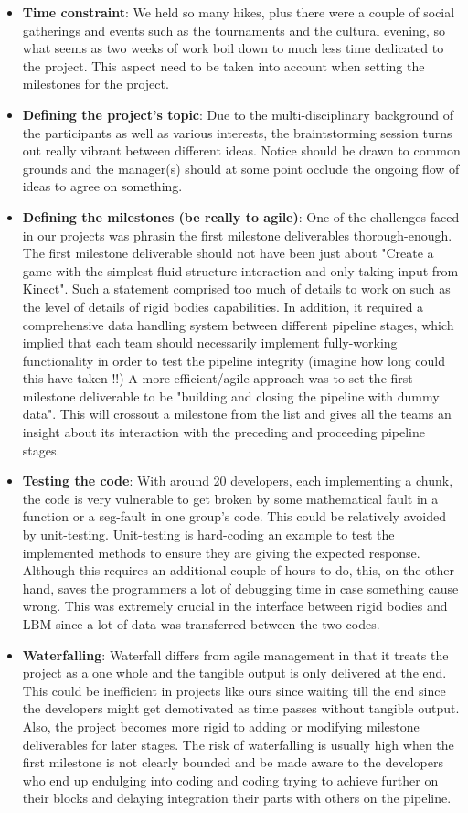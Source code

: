 \begin{itemize}
  \item \textbf{Time constraint}: We held so many hikes, plus there were a couple of social gatherings and events such as the tournaments and the cultural evening, so what seems as two weeks of work boil down to much less time dedicated to the project. This aspect need to be taken into account when setting the milestones for the project.
  \item \textbf{Defining the project's topic}: Due to the multi-disciplinary background of the participants as well as various interests, the braintstorming session turns out really vibrant between different ideas. Notice should be drawn to common grounds and the manager(s) should at some point occlude the ongoing flow of ideas to agree on something.
  \item \textbf{Defining the milestones (be really to agile)}: One of the challenges faced in our projects was phrasin the first milestone deliverables thorough-enough. The first milestone deliverable should not have been just about "Create a game with the simplest fluid-structure interaction and only taking input from Kinect". Such a statement comprised too much of details to work on such as the level of details of rigid bodies capabilities. In addition, it required a comprehensive data handling system between different pipeline stages, which implied that each team should necessarily implement fully-working functionality in order to test the pipeline integrity (imagine how long could this have taken !!)
  A more efficient/agile approach was to set the first milestone deliverable to be "building and closing the pipeline with dummy data". This will crossout a milestone from the list and gives all the teams an insight about its interaction with the preceding and proceeding pipeline stages.
  \item \textbf{Testing the code}: With around 20 developers, each implementing a chunk, the code is very vulnerable to get broken by some mathematical fault in a function or a seg-fault in one group's code. This could be relatively avoided by unit-testing. Unit-testing is hard-coding an example to test the implemented methods to ensure they are giving the expected response. Although this requires an additional couple of hours to do, this, on the other hand, saves the programmers a lot of debugging time in case something cause wrong. This was extremely crucial in the interface between rigid bodies and LBM since a lot of data was transferred between the two codes.
  \item \textbf{Waterfalling}: Waterfall differs from agile management in that it treats the project as a one whole and the tangible output is only delivered at the end. This could be inefficient in projects like ours since waiting till the end since the developers might get demotivated as time passes without tangible output. Also, the project becomes more rigid to adding or modifying milestone deliverables for later stages. The risk of waterfalling is usually high when the first milestone is not clearly bounded and be made aware to the developers who end up endulging into coding and coding trying to achieve further on their blocks and delaying integration their parts with others on the pipeline.

\end{itemize}
